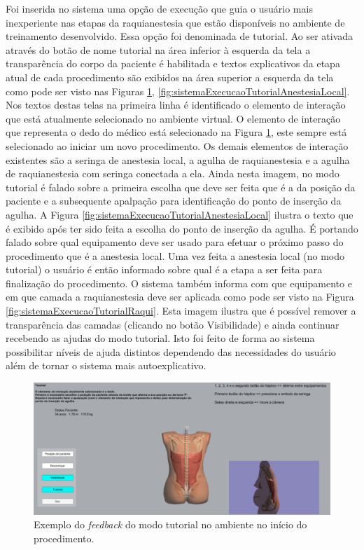 Foi inserida no sistema uma opção de execução que guia o usuário mais inexperiente nas etapas da raquianestesia que estão disponíveis no ambiente de treinamento desenvolvido. Essa opção foi denominada de tutorial. Ao ser ativada através do botão de nome tutorial na área inferior à esquerda da tela a transparência do corpo da paciente é habilitada e textos explicativos da etapa atual de cada procedimento são exibidos na área superior a esquerda da tela como pode ser visto nas Figuras \ref{fig:sistemaExecucaoTutorialApalpacao}, \ref{fig:sistemaExecucaoTutorialAnestesiaLocal}. Nos textos destas telas na primeira linha é identificado o elemento de interação que está atualmente selecionado no ambiente virtual. O elemento de interação que representa o dedo do médico está selecionado na Figura \ref{fig:sistemaExecucaoTutorialApalpacao}, este sempre está selecionado ao iniciar um novo procedimento. Os demais elementos de interação existentes são a seringa de anestesia local, a agulha de raquianestesia e a agulha de raquianestesia com seringa conectada a ela. Ainda nesta imagem, no modo tutorial é falado sobre a primeira escolha que deve ser feita que é a da posição da paciente e a subsequente apalpação para identificação do ponto de inserção da agulha. 
A Figura \ref{fig:sistemaExecucaoTutorialAnestesiaLocal} ilustra o texto que é exibido após ter sido feita a escolha do ponto de inserção da agulha. É portando falado sobre qual equipamento deve ser usado para efetuar o próximo passo do procedimento que é a anestesia local. Uma vez feita a anestesia local (no modo tutorial) o usuário é então informado sobre qual é a etapa a ser feita para finalização do procedimento. O sistema também informa com que equipamento e em que camada a raquianestesia deve ser aplicada como pode ser visto na Figura \ref{fig:sistemaExecucaoTutorialRaqui}. Esta imagem ilustra que é possível remover a transparência das camadas (clicando no botão Visibilidade) e ainda continuar recebendo as ajudas do modo tutorial. Isto foi feito de forma ao sistema possibilitar níveis de ajuda distintos dependendo das necessidades do usuário além de tornar o sistema mais autoexplicativo. 

\begin{figure}[ht!]
    \centering
    \includegraphics[width=\textwidth]{capitulos/figuras/sistemaExecucaoTutorialApalpacao.png} 
    \caption{Exemplo do \textit{feedback} do modo tutorial no ambiente no início do procedimento.}
    \label{fig:sistemaExecucaoTutorialApalpacao}
\end{figure}

